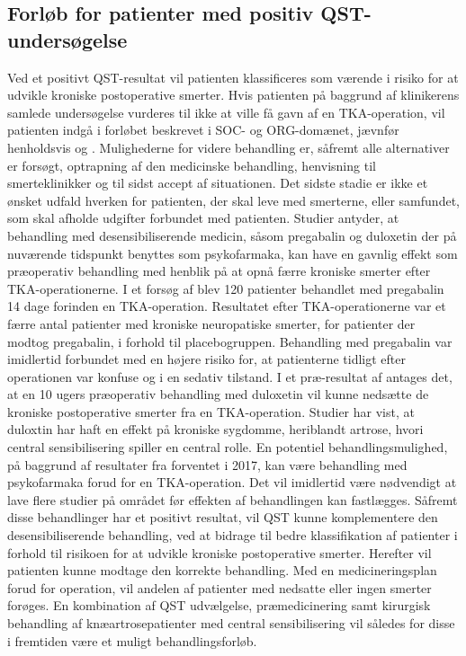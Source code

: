 \subsection{Forløb for patienter med positiv QST-undersøgelse}
Ved et positivt QST-resultat vil patienten klassificeres som værende i risiko for at udvikle kroniske postoperative smerter. Hvis patienten på baggrund af klinikerens samlede undersøgelse vurderes til ikke at ville få gavn af en TKA-operation, vil patienten indgå i forløbet beskrevet i SOC- og ORG-domænet, jævnfør henholdsvis  og . Mulighederne for videre behandling er, såfremt alle alternativer er forsøgt, optrapning af den medicinske behandling, henvisning til smerteklinikker og til sidst accept af situationen. Det sidste stadie er ikke et ønsket udfald hverken for patienten, der skal leve med smerterne, eller samfundet, som skal afholde udgifter forbundet med patienten.
Studier antyder, at behandling med desensibiliserende medicin, såsom pregabalin og duloxetin der på nuværende tidspunkt benyttes som psykofarmaka, kan have en gavnlig effekt som præoperativ behandling med henblik på at opnå færre kroniske smerter efter TKA-operationerne. I et forsøg af  blev 120 patienter behandlet med pregabalin 14 dage forinden en TKA-operation. Resultatet efter TKA-operationerne var et færre antal patienter med kroniske neuropatiske smerter, for patienter der modtog pregabalin, i forhold til placebogruppen. Behandling med pregabalin var imidlertid forbundet med en højere risiko for, at patienterne tidligt efter operationen var konfuse og i en sedativ tilstand. \citep{Buvanendran2010} I et præ-resultat af  antages det, at en 10 ugers præoperativ behandling med duloxetin vil kunne nedsætte de kroniske postoperative smerter fra en TKA-operation. Studier har vist, at duloxtin har haft en effekt på kroniske sygdomme, heriblandt artrose, hvori central sensibilisering spiller en central rolle. \citep{Blikman2016} En potentiel behandlingsmulighed, på baggrund af resultater fra   forventet i 2017, kan være behandling med psykofarmaka forud for en TKA-operation. Det vil imidlertid være nødvendigt at lave flere studier på området før effekten af behandlingen kan fastlægges. Såfremt disse behandlinger har et positivt resultat, vil QST kunne komplementere den desensibiliserende behandling, ved at bidrage til bedre klassifikation af patienter i forhold til risikoen for at udvikle kroniske postoperative smerter. Herefter vil patienten kunne modtage den korrekte behandling. Med en medicineringsplan forud for operation, vil andelen af patienter med nedsatte eller ingen smerter forøges. En kombination af QST udvælgelse,  præmedicinering samt kirurgisk behandling af knæartrosepatienter med central sensibilisering vil således for disse i fremtiden være et muligt behandlingsforløb.


